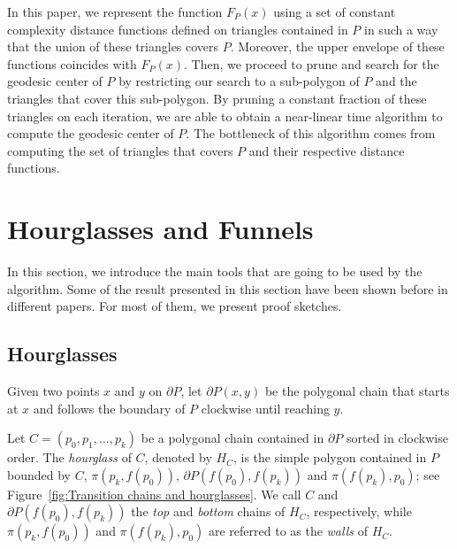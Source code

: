 \documentclass[a4paper,UKenglish]{lipics}
\newcommand{\F}[2]{\ensuremath{F_{\scriptscriptstyle #1}(#2)}}
\newcommand{\ff}[1]{\ensuremath{f(#1)}}
\newcommand{\p}[2]{\ensuremath{\pi(#1, #2)}}
\begin{document}
In this paper, we represent the function $\F{P}{x}$ using a set of constant complexity distance functions defined on triangles contained in $P$ in such a way that the union of these triangles covers $P$. Moreover, the upper envelope of these functions coincides with $\F{P}{x}$.
Then, we proceed to prune and search for the geodesic center of $P$ by restricting our search to a sub-polygon of $P$ and the triangles that cover this sub-polygon. By pruning a constant fraction of these triangles on each iteration, we are able to obtain a near-linear time algorithm to compute the geodesic center of $P$. The bottleneck of this algorithm comes from computing the set of triangles that covers $P$ and their respective distance functions.


\section{Hourglasses and Funnels}
In this section, we introduce the main tools that are going to be used by the algorithm. Some of the result presented in this section have been shown before in different papers. For most of them, we present proof sketches.

\subsection{Hourglasses}

Given two points $x$ and $y$ on $\partial P$, let $\partial P(x,y)$ be the polygonal chain that starts at $x$ and follows the boundary of $P$ clockwise until reaching $y$.

Let $C = (p_0, p_1, \ldots, p_k)$ be a polygonal chain contained in $\partial P$ sorted in clockwise order.
The \emph{hourglass} of $C$, denoted by $H_C$, is the simple polygon contained in $P$ bounded by $C$, $\p{p_k}{\ff{p_0}}$, $\partial P(\ff{p_0}, \ff{p_k})$ and $\p{\ff{p_k}}{ p_0}$; see Figure~\ref{fig:Transition chains and hourglasses}. 
We call $C$ and $\partial P(\ff{p_0}, \ff{p_k})$ the \emph{top} and \emph{bottom} chains of $H_C$, respectively, while $\p{p_k}{ \ff{p_0}}$ and $\p{\ff{p_k}}{p_0}$ are referred to as the \emph{walls} of $H_C$.
\end{document}
